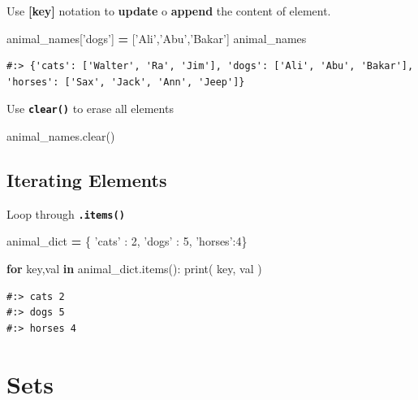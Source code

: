 \documentclass[
]{book}
\newenvironment{Shaded}{\begin{snugshade}}{\end{snugshade}}
\newcommand{\BuiltInTok}[1]{#1}
\newcommand{\ControlFlowTok}[1]{\textcolor[rgb]{0.27,0.27,0.27}{\textbf{#1}}}
\newcommand{\DecValTok}[1]{\textcolor[rgb]{0.06,0.06,0.06}{#1}}
\newcommand{\KeywordTok}[1]{\textcolor[rgb]{0.27,0.27,0.27}{\textbf{#1}}}
\newcommand{\NormalTok}[1]{#1}
\newcommand{\OperatorTok}[1]{\textcolor[rgb]{0.43,0.43,0.43}{\textbf{#1}}}
\newcommand{\StringTok}[1]{\textcolor[rgb]{0.5,0.5,0.5}{#1}}
\begin{document}
Use \textbf{{[}key{]}} notation to \textbf{update} o \textbf{append} the content of element.

\begin{Shaded}
\begin{Highlighting}[]
\NormalTok{animal_names[}\StringTok{'dogs'}\NormalTok{] }\OperatorTok{=}\NormalTok{ [}\StringTok{'Ali'}\NormalTok{,}\StringTok{'Abu'}\NormalTok{,}\StringTok{'Bakar'}\NormalTok{]}
\NormalTok{animal_names}
\end{Highlighting}
\end{Shaded}

\begin{verbatim}
#:> {'cats': ['Walter', 'Ra', 'Jim'], 'dogs': ['Ali', 'Abu', 'Bakar'], 'horses': ['Sax', 'Jack', 'Ann', 'Jeep']}
\end{verbatim}

Use \textbf{\texttt{clear()}} to erase all elements

\begin{Shaded}
\begin{Highlighting}[]
\NormalTok{animal_names.clear()}
\end{Highlighting}
\end{Shaded}

\hypertarget{iterating-elements}{%
\subsection{Iterating Elements}\label{iterating-elements}}

Loop through \textbf{\texttt{.items()}}

\begin{Shaded}
\begin{Highlighting}[]
\NormalTok{animal_dict }\OperatorTok{=}\NormalTok{ \{ }\StringTok{'cats'}\NormalTok{ : }\DecValTok{2}\NormalTok{, }\StringTok{'dogs'}\NormalTok{ : }\DecValTok{5}\NormalTok{, }\StringTok{'horses'}\NormalTok{:}\DecValTok{4}\NormalTok{\}}

\ControlFlowTok{for}\NormalTok{ key,val }\KeywordTok{in}\NormalTok{ animal_dict.items():}
  \BuiltInTok{print}\NormalTok{( key, val )}
\end{Highlighting}
\end{Shaded}

\begin{verbatim}
#:> cats 2
#:> dogs 5
#:> horses 4
\end{verbatim}

\hypertarget{sets}{%
\section{Sets}\label{sets}}
\end{document}
